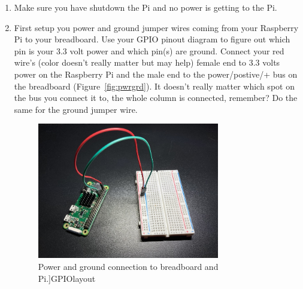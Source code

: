 \documentclass{article}\usepackage[]{graphicx}\usepackage[]{color}
\begin{document}
\begin{enumerate}
\item Make sure you have shutdown the Pi and no power is getting to the Pi.
\item First setup you power and ground jumper wires coming from your Raspberry Pi to your breadboard. Use your GPIO pinout diagram to figure out which pin is your 3.3 volt power and which pin(s) are ground. Connect your red wire's (color doesn't really matter but may help) female end to 3.3 volts power on the Raspberry Pi and the male end to the power/postive/+ bus on the breadboard (Figure~\ref{fig:pwrgrd}). It doesn't really matter which spot on the bus you connect it to, the whole column is connected, remember? Do the same for the ground jumper wire.

\begin{figure}[h]
\begin{center}
\includegraphics[width=0.75\textwidth]{pwrgnd}
\caption{Power and ground connection to breadboard and Pi.]{GPIOlayout}\label{GPIO}}
\end{center}
\end{figure}


\end{enumerate}
\end{document}
